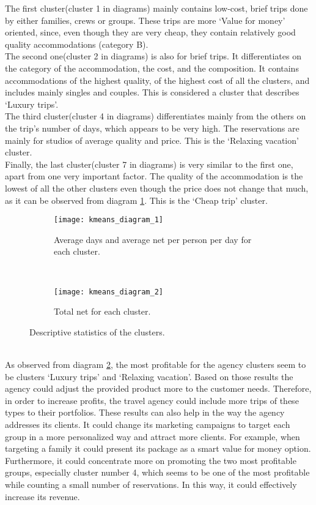 The first cluster(cluster 1 in diagrams) mainly contains low-cost, brief trips done by either families, crews or groups. These trips are more `Value for money' oriented, since, even though they are very cheap, they contain relatively good quality accommodations (category B). \\
The second one(cluster 2 in diagrams) is also for brief trips. It differentiates on the category of the accommodation, the cost, and the composition. It contains accommodations of the highest quality, of the highest cost of all the clusters, and includes mainly singles and couples. This is considered a cluster that describes `Luxury trips'. \\
The third cluster(cluster 4 in diagrams) differentiates mainly from the others on the trip's number of days, which appears to be very high. The reservations are mainly for studios of average quality and price. This is the `Relaxing vacation' cluster. \\
Finally, the last cluster(cluster 7 in diagrams) is very similar to the first one, apart from one very important factor. The quality of the accommodation is the lowest of all the other clusters even though the price does not change that much, as it can be observed from diagram \ref{fig:kmeans1}. This is the `Cheap trip' cluster.
\begin{figure}[ht]
\centering
\begin{subfigure}{.8\textwidth}
\centering
\texttt{[image: kmeans\_diagram\_1]}
\caption{Average days and average net per person per day for each cluster.}
\label{fig:kmeans1}
\end{subfigure}%
\\
\begin{subfigure}{.8\textwidth}
\centering
\texttt{[image: kmeans\_diagram\_2]}
\caption{Total net for each cluster.}
\label{fig:kmeans2}
\end{subfigure}%
\caption{Descriptive statistics of the clusters.}
\label{fig:kmeans_descriptives}
\end{figure}
\\
As observed from diagram \ref{fig:kmeans2}, the most profitable for the agency clusters seem to be clusters `Luxury trips' and `Relaxing vacation'. Based on those results the agency could adjust the provided product more to the customer needs. Therefore, in order to increase profits, the travel agency could include more trips of these types to their portfolios. These results can also help in the way the agency addresses its clients. It could change its marketing campaigns to target each group in a more personalized way and attract more clients. For example, when targeting a family it could present its package as a smart value for money option. Furthermore, it could concentrate more on promoting the two most profitable groups, especially cluster number 4, which seems to be one of the most profitable while counting a small number of reservations. In this way, it could effectively increase its revenue. \\

